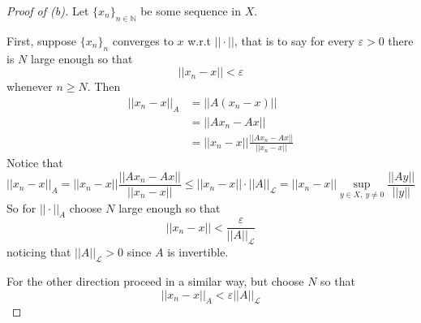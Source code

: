 \begin{proof}[Proof of (b)]
    Let $\{x_n\}_{n\in\mathbb N}$ be some sequence in $X$. 

    First, suppose $\{x_n\}_n$ converges to $x$ w.r.t $||\cdot||$, 
    that is to say for every $\varepsilon > 0$ there is $N$ large 
    enough so that 
    \[
        ||x_n - x|| < \varepsilon
    \]
    whenever $n \geq N$.
    Then 
    \begin{align*}
        ||x_n-x||_A &= ||A(x_n - x)|| \\ 
                    &= ||Ax_n - Ax|| \\ 
                    &= ||x_n-x||\frac{||Ax_n - Ax||}{||x_n-x||}
    \end{align*}
    Notice that 
    \[
        ||x_n-x||_A = ||x_n-x||\frac{||Ax_n - Ax||}{||x_n-x||} 
        \leq ||x_n-x|| \cdot ||A||_{\mathcal L} 
        = ||x_n-x|| \sup_{y \in X, \ y \neq 0}\frac{||Ay||}{||y||}
    \]
    So for $||\cdot||_A$ choose $N$ large enough so that 
    \[
        ||x_n-x|| < \frac{\varepsilon}{||A||_{\mathcal L}} 
    \]
    noticing that $||A||_{\mathcal L} > 0$ since $A$ is invertible.  

    For the other direction proceed in a similar way, but 
    choose $N$ so that 
    \[
        ||x_n-x||_A < \varepsilon||A||_{\mathcal L}
    \]
\end{proof}

\newpage 

